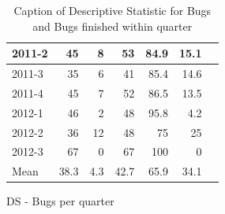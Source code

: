 \documentclass[UKenglish]{ifimaster}  %
\begin{document}
\begin{appendices}
\begin{table}[!htbp]
\begin{adjustwidth}{-1.5cm}{}
\begin{subfigure}[b]{0.4\textwidth}
{\begin{tabular}{ | l | r | r | r | r | r | r | }
	2011-2 & 45 & 8 & 53 & 84.9 & 15.1 \\ \hline
	2011-3 & 35 & 6 & 41 & 85.4 & 14.6 \\ \hline
	2011-4 & 45 & 7 & 52 & 86.5 & 13.5 \\ \hline
	2012-1 & 46 & 2 & 48 & 95.8 & 4.2 \\ \hline
	2012-2 & 36 & 12 & 48 & 75 & 25 \\ \hline
	2012-3 & 67 & 0 & 67 & 100 & 0 \\ \hline
	Mean & 38.3 & 4.3 & 42.7 & 65.9 & 34.1  \\ \hline
\end{tabular}
}
\caption{DS - Bugs per quarter}
 \label{DS:FTPQ:7}
\end{subfigure}
\end{adjustwidth}
\caption[Optional caption for list of figures]{Caption of Descriptive Statistic for Bugs and Bugs finished within quarter}
\label{DS:7:5} %
\end{table}


\end{appendices}
\end{document}
